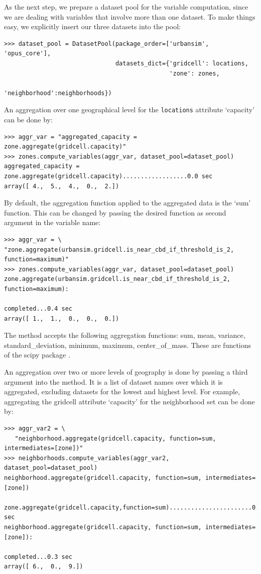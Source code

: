 As the next step, we prepare a dataset pool  for the variable computation, since we are dealing with variables
that involve more than one dataset. To make things easy, we explicitly insert
our three datasets into the pool:
\begin{verbatim}
>>> dataset_pool = DatasetPool(package_order=['urbansim', 'opus_core'],
                               datasets_dict={'gridcell': locations,
                                              'zone': zones, 
                                              'neighborhood':neighborhoods})
\end{verbatim}
An aggregation over one geographical level for the \verb|locations|
attribute \attributesindex `capacity' can be done by: \variablesindex
\attributesindex
\begin{verbatim}
>>> aggr_var = "aggregated_capacity = zone.aggregate(gridcell.capacity)"
>>> zones.compute_variables(aggr_var, dataset_pool=dataset_pool)
aggregated_capacity = zone.aggregate(gridcell.capacity)..................0.0 sec
array([ 4.,  5.,  4.,  0.,  2.])
\end{verbatim}
By default, the aggregation function applied to the aggregated data is the
`sum' function. This can be changed by passing the desired function as second
argument in the variable \variablesindex name: \variablesindex
\begin{verbatim}
>>> aggr_var = \
"zone.aggregate(urbansim.gridcell.is_near_cbd_if_threshold_is_2, function=maximum)"
>>> zones.compute_variables(aggr_var, dataset_pool=dataset_pool)
zone.aggregate(urbansim.gridcell.is_near_cbd_if_threshold_is_2, function=maximum):
                                                            completed...0.4 sec
array([ 1.,  1.,  0.,  0.,  0.])
\end{verbatim}

The  method accepts the following aggregation functions:
sum, mean, variance, standard_deviation, minimum, maximum,
center_of_mass. These are functions of the scipy package
.

An aggregation over two or more levels of geography is done by passing a
third argument into the \class{aggregate} method. It is a list of dataset
\datasetindex names over which it is aggregated, excluding datasets
\datasetindex for the lowest and highest level. For example, aggregating
the gridcell attribute \attributesindex `capacity' for the neighborhood set
can be done by: \variablesindex \attributesindex
\begin{verbatim}
>>> aggr_var2 = \
   "neighborhood.aggregate(gridcell.capacity, function=sum, intermediates=[zone])"
>>> neighborhoods.compute_variables(aggr_var2, dataset_pool=dataset_pool)
neighborhood.aggregate(gridcell.capacity, function=sum, intermediates=[zone])
    zone.aggregate(gridcell.capacity,function=sum).......................0.0 sec
neighborhood.aggregate(gridcell.capacity, function=sum, intermediates=[zone]):
                                                            completed...0.3 sec
array([ 6.,  0.,  9.])
\end{verbatim}

